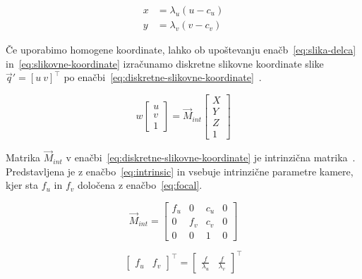 \begin{subequations}
\begin{align}
	x &= \lambda_u (u - c_u) \\
    y &= \lambda_v (v - c_v)
\end{align}
\label{eq:slikovne-koordinate}
\end{subequations}

Če uporabimo homogene koordinate, lahko ob upoštevanju enačb~\eqref{eq:slika-delca} in~\eqref{eq:slikovne-koordinate} izračunamo diskretne slikovne koordinate slike $\vec{q}' = \left[ u~ v \right]^\top$ po enačbi~\eqref{eq:diskretne-slikovne-koordinate}~\cite{trucco1998introductory}.


\begin{equation}
	w \begin{bmatrix}
	u \\ v \\ 1
	\end{bmatrix} = \vec{M}_{int}
    \begin{bmatrix}
    X \\ Y \\ Z \\ 1
    \end{bmatrix}
    \label{eq:diskretne-slikovne-koordinate}
\end{equation}

Matrika $\vec{M}_{int}$ v enačbi~\eqref{eq:diskretne-slikovne-koordinate} je intrinzična matrika~\cite{trucco1998introductory}. Predstavljena je z enačbo~\eqref{eq:intrinsic} in vsebuje intrinzične parametre kamere, kjer sta $f_u$ in $f_v$ določena z enačbo~\eqref{eq:focal}.

\begin{equation}
\vec{M}_{int} = \begin{bmatrix}
	f_u & 0 & c_u & 0 \\
    0 & f_v & c_v & 0 \\
    0 & 0 & 1 & 0
\end{bmatrix}
\label{eq:intrinsic}
\end{equation}

\begin{equation}
\begin{bmatrix}
	f_u & f_v
\end{bmatrix}^\top = \begin{bmatrix}
	\frac{f}{\lambda_u} & \frac{f}{\lambda_v}
\end{bmatrix}^\top
\label{eq:focal}
\end{equation}


